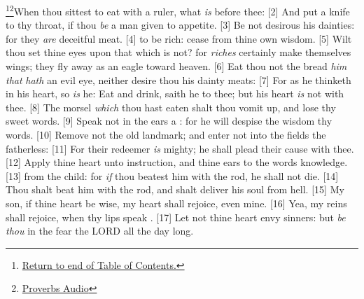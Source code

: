 \footnote{\textcolor[cmyk]{0.99998,1,0,0}{\hyperlink{TOC}{Return to end of Table of Contents.}}}\footnote{\href{https://www.audioverse.org/english/audiobibles/books/ENGKJV/O/Prov/1}{\textcolor[cmyk]{0.99998,1,0,0}{Proverbs Audio}}}\textcolor[cmyk]{0.99998,1,0,0}{When thou sittest to eat with a ruler,   what \emph{is} before thee:}
[2] \textcolor[cmyk]{0.99998,1,0,0}{And put a knife to thy throat, if thou \emph{be} a man given to appetite.}
[3] \textcolor[cmyk]{0.99998,1,0,0}{Be not desirous  his dainties: for they \emph{are} deceitful meat.}
[4] \textcolor[cmyk]{0.99998,1,0,0}{    to be rich: cease from thine own wisdom.}
[5] \textcolor[cmyk]{0.99998,1,0,0}{Wilt thou set thine eyes upon that which is not? for \emph{riches} certainly make themselves wings; they fly away as an eagle toward heaven.}
[6] \textcolor[cmyk]{0.99998,1,0,0}{Eat thou not the bread  \emph{him} \emph{that} \emph{hath} an evil eye, neither desire thou his dainty meats:}
[7] \textcolor[cmyk]{0.99998,1,0,0}{For as he thinketh in his heart, so \emph{is} he: Eat and drink, saith he to thee; but his heart \emph{is} not with thee.}
[8] \textcolor[cmyk]{0.99998,1,0,0}{The morsel \emph{which} thou hast eaten shalt thou vomit up, and lose thy sweet words.}
[9] \textcolor[cmyk]{0.99998,1,0,0}{Speak not in the ears  a  : for he will despise the wisdom  thy words.}
[10] \textcolor[cmyk]{0.99998,1,0,0}{Remove not the old landmark; and enter not into the fields  the fatherless:}
[11] \textcolor[cmyk]{0.99998,1,0,0}{For their redeemer \emph{is} mighty; he shall plead their cause with thee.}
[12] \textcolor[cmyk]{0.99998,1,0,0}{Apply thine heart unto instruction, and thine ears to the words  knowledge.}
[13] \textcolor[cmyk]{0.99998,1,0,0}{  from the child: for \emph{if} thou beatest him with the rod, he shall not die.}
[14] \textcolor[cmyk]{0.99998,1,0,0}{Thou shalt beat him with the rod, and shalt deliver his soul from hell.}
[15] \textcolor[cmyk]{0.99998,1,0,0}{My son, if thine heart be wise, my heart shall rejoice, even mine.}
[16] \textcolor[cmyk]{0.99998,1,0,0}{Yea, my reins shall rejoice, when thy lips speak  .}
[17] \textcolor[cmyk]{0.99998,1,0,0}{Let not thine heart envy sinners: but \emph{be} \emph{thou} in the fear  the LORD all the day long.}
